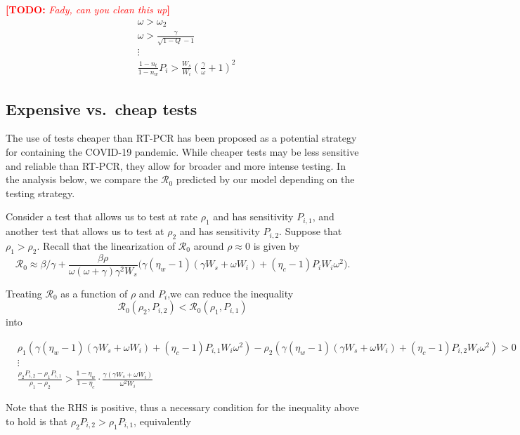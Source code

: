 \documentclass[12pt]{article}
\newcommand{\Rnum}{\mathcal{R}_0}
\newcommand{\comment}{\showcomment}
\newcommand{\showcomment}[3]{\textcolor{#1}{\textbf{[#2: }\textsl{#3}\textbf{]}}}
\newcommand{\todo}[1]{\comment{red}{TODO}{#1}}
\theoremstyle{definition} %
\begin{document}
\todo{Fady, can you clean this up}
\begin{align}\label{eq:necsuf}
    &\omega > \omega_2 \nonumber \\
    &\omega > \frac{\gamma}{\sqrt{1-Q}-1} \nonumber \\
    &\vdots \nonumber \\ 
    &\frac{1-n_{t}}{1-n_{w}}P_{i}>\frac{W_{s}}{W_{i}}\left(\frac{\gamma}{\omega}+1\right)^{2}
\end{align}


\subsection{Expensive vs.\ cheap tests}

The use of tests cheaper than RT-PCR has been proposed as a potential strategy for containing the COVID-19 pandemic. While cheaper tests may be less sensitive and reliable than RT-PCR, they allow for broader and more intense testing. In the analysis below, we compare the $\Rnum$ predicted by our model depending on the testing strategy. 

Consider a test that allows us to test at rate $\rho_1$ and has sensitivity $P_{i,1}$, and another test that allows us to test at $\rho_2$ and has sensitivity $P_{i,2}$. Suppose that $\rho_1 > \rho_2$. Recall that the linearization of $\Rnum$ around $\rho \approx 0$ is given by $$\Rnum \approx \beta/\gamma + \frac{\beta \rho}{\omega (\omega+\gamma) \gamma^2 W_s} \Big(\gamma(\eta_w-1)(\gamma W_s+\omega W_i) + (\eta_c -1)P_iW_i \omega^2 \Big).$$


Treating $\Rnum$ as a function of $\rho$ and $P_i$,we can reduce the inequality $$\Rnum(\rho_2, P_{i,2}) < \Rnum(\rho_1, P_{i,1})$$ into 

\begin{align}\label{eq:rho1vsrho2}
    &\rho_1\left(\gamma(\eta_w-1)(\gamma W_s + \omega W_i) + (\eta_c-1)P_{i, 1}W_i\omega^2\right) - \rho_2\left(\gamma(\eta_w-1)(\gamma W_s + \omega W_i) + (\eta_c-1)P_{i, 2}W_i\omega^2\right) > 0 \nonumber \\
    &\vdots \nonumber \\
    &\frac{\rho_2P_{i, 2}-\rho_1P_{i, 1} }{\rho_1-\rho_2} > \frac{1-\eta_w}{1-\eta_c}\cdot \frac{\gamma(\gamma W_s + \omega W_i)}{\omega^2 W_i}
\end{align}

Note that the RHS is positive, thus a necessary condition for the inequality above to hold is that $\rho_2P_{i,2} > \rho_1P_{i,1}$, equivalently 
\end{document}
